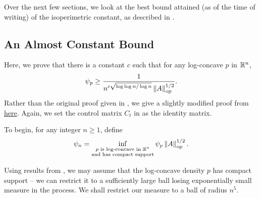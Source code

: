 \documentclass{article}
\begin{document}
		Over the next few sections, we look at the best bound attained (as of the time of writing) of the isoperimetric constant, as described in \cite{chen2021constant}.

	\subsection{An Almost Constant Bound}

		Here, we prove that there is a constant $c$ such that for any log-concave $p$ in $\mathbb{R}^n$,
		\[ \psi_p \geq \frac{1}{n^{c \sqrt{\log \log n / \log n}} \left\lVert A\right\rVert_{\text{op}}^{1/2}}. \]
		Rather than the original proof given in \cite{chen2021constant}, we give a slightly modified proof from \href{https://www.him.uni-bonn.de/fileadmin/him/Lecture_Notes/chen_lecture_notes.pdf}{here}. Again, we set the control matrix $C_t$ in  as the identity matrix.

		To begin, for any integer $n \geq 1$, define
		\[ \psi_n = \inf_{\substack{\text{$p$ is log-concave in $\mathbb{R}^n$} \\ \text{and has compact support}}} \psi_p\left\lVert A\right\rVert_{\text{op}}^{1/2}. \]

		Using results from \cite{Paouris2006}, we may assume that the log-concave density $p$ has compact support -- we can restrict it to a sufficiently large ball losing exponentially small measure in the process. We shall restrict our measure to a ball of radius $n^5$. %
\end{document}
